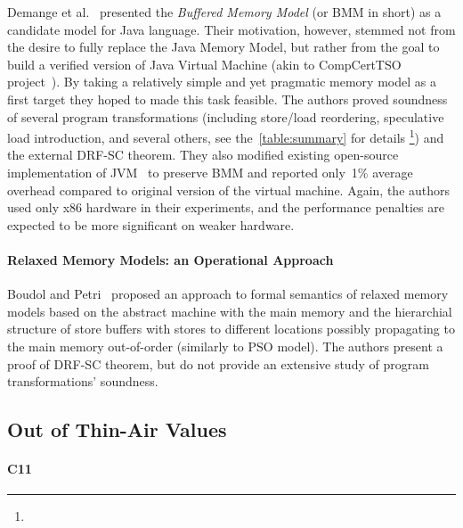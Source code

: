 Demange et al.~\cite{Demange-al:POPL13} presented 
the \emph{Buffered Memory Model} (or BMM in short)
as a candidate model for Java language.
Their motivation, however, stemmed not from the desire 
to fully replace the Java Memory Model, but rather 
from the goal to build a verified version of 
Java Virtual Machine (akin to CompCertTSO project~\cite{Sevcik-al:JACM13}).
By taking a relatively simple and yet pragmatic memory model
as a first target they hoped to made this task feasible. 
The authors proved soundness of several program transformations
(including store/load reordering, speculative load introduction,
and several others, see 
the~\cref{table:summary} for details%
\footnote{})
and the external DRF-SC theorem. 
They also modified existing open-source implementation of 
JVM~\cite{Pizlo-al:ECCS10} to preserve BMM and 
reported only~1\% average overhead 
compared to original version of the virtual machine. 
Again, the authors used only x86 hardware in their 
experiments, and the performance penalties 
are expected to be more significant on weaker hardware.   

\paragraph{Relaxed Memory Models: an Operational Approach}

Boudol and Petri~\cite{Boudol-Petri:POPL09} proposed 
an approach to formal semantics of relaxed memory models 
based on the abstract machine with the main memory 
and the hierarchial structure of store buffers 
with stores to different locations possibly 
propagating to the main memory out-of-order
(similarly to PSO model).
The authors present a proof of DRF-SC theorem,
but do not provide an extensive study 
of program transformations' soundness.

\subsection{Out of Thin-Air Values}

\paragraph{C11}

